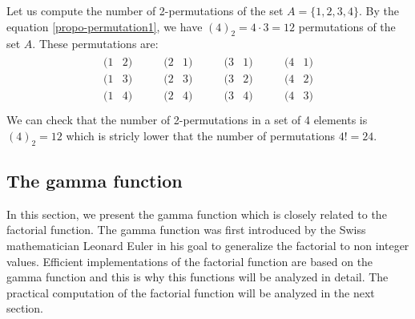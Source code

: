 \begin{example}
Let us compute the number of 2-permutations of the set $A=\{1,2,3,4\}$.
By the equation \ref{propo-permutation1}, we have $(4)_2=4\cdot 3 = 12$ 
permutations of the set $A$. These permutations are:
\begin{eqnarray}
\begin{array}{cc}
(1 &     2 ) \\
(1 &     3 ) \\
(1 &     4 ) \\
\end{array}
\qquad 
\begin{array}{cc}
(2 &     1 ) \\
(2 &     3 ) \\
(2 &     4 ) \\
\end{array}
\qquad 
\begin{array}{cc}
(3 &     1 ) \\
(3 &     2 ) \\
(3 &     4 ) \\
\end{array}
\qquad
\begin{array}{cc}
(4 &     1 ) \\
(4 &     2 ) \\
(4 &     3 ) \\
\end{array}
\end{eqnarray}
We can check that the number of 2-permutations in a set of 4 elements is $(4)_2=12$
which is stricly lower that the number of permutations $4!=24$. 
\end{example}


\subsection{The gamma function}
\label{section-gammafun}

In this section, we present the gamma function which is 
closely related to the factorial function.
The gamma function was first introduced by the Swiss mathematician
Leonard Euler in his goal to generalize the factorial to non
integer values\cite{SebahGourdon2002}.
Efficient implementations of the factorial function are based 
on the gamma function and this is why this functions 
will be analyzed in detail. The practical computation 
of the factorial function will be analyzed in the next section.

